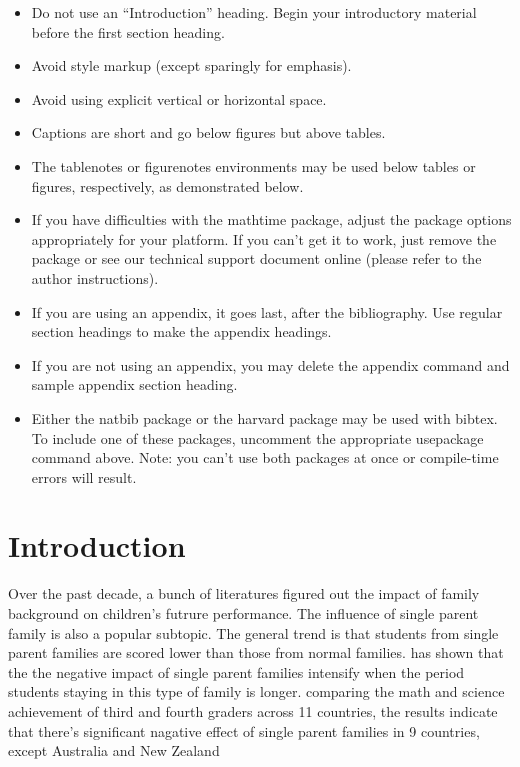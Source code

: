 \documentclass[]{AEA}
\begin{document}
\begin{itemize}
\item Do not use an ``Introduction'' heading. Begin your introductory material
before the first section heading.

\item Avoid style markup (except sparingly for emphasis).

\item Avoid using explicit vertical or horizontal space.

\item Captions are short and go below figures but above tables.

\item The tablenotes or figurenotes environments may be used below tables
or figures, respectively, as demonstrated below.

\item If you have difficulties with the mathtime package, adjust the package
options appropriately for your platform. If you can't get it to work, just
remove the package or see our technical support document online (please
refer to the author instructions).

\item If you are using an appendix, it goes last, after the bibliography.
Use regular section headings to make the appendix headings.

\item If you are not using an appendix, you may delete the appendix command
and sample appendix section heading.

\item Either the natbib package or the harvard package may be used with bibtex.
To include one of these packages, uncomment the appropriate usepackage command
above. Note: you can't use both packages at once or compile-time errors will result.

\end{itemize}

\section{Introduction}

    Over the past decade, a bunch of literatures figured out the impact of family background on children's futrure performance. The influence of single parent family is also a popular subtopic. The general trend is that students from single parent families are scored lower than those from normal families.\citep{barajas2011} 
    \citet{krein1988} has shown that the the negative impact of single parent families intensify when the period students staying in this type of family is longer. 
    \citet{pong2003} comparing the math and science achievement of third and fourth graders across 11 countries, the results indicate that there's significant nagative effect of single parent families in 9 countries, except Australia and New Zealand
\end{document}
